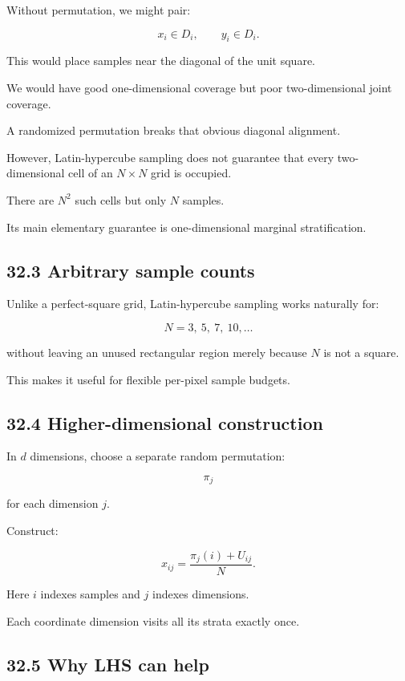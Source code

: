 Without permutation, we might pair:

\[ x_i\in D_i,\qquad y_i\in D_i. \]

This would place samples near the diagonal of the unit square.

We would have good one-dimensional coverage but poor two-dimensional joint coverage.

A randomized permutation breaks that obvious diagonal alignment.

However, Latin-hypercube sampling does not guarantee that every two-dimensional cell of an \(N\times N\) grid is occupied.

There are \(N^2\) such cells but only \(N\) samples.

Its main elementary guarantee is one-dimensional marginal stratification.

\subsection{32.3 Arbitrary sample counts}\label{02-foundations-ii-ch031-arbitrary-sample-counts}

Unlike a perfect-square grid, Latin-hypercube sampling works naturally for:

\[ N=3,\ 5,\ 7,\ 10,\ldots \]

without leaving an unused rectangular region merely because \(N\) is not a square.

This makes it useful for flexible per-pixel sample budgets.

\subsection{32.4 Higher-dimensional construction}\label{02-foundations-ii-ch031-higher-dimensional-construction}

In \(d\) dimensions, choose a separate random permutation:

\[ \pi_j \]

for each dimension \(j\).

Construct:

\[ \boxed{ x_{ij}= \frac{\pi_j(i)+U_{ij}}N }. \]

Here \(i\) indexes samples and \(j\) indexes dimensions.

Each coordinate dimension visits all its strata exactly once.

\subsection{32.5 Why LHS can help}\label{02-foundations-ii-ch031-why-lhs-can-help}


